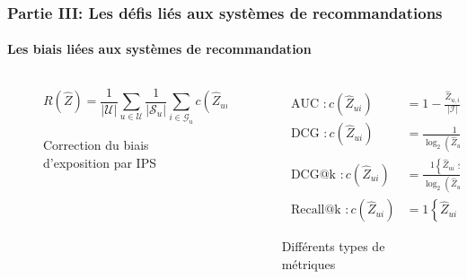 \begin{frame}

    \frametitle{Partie III: Les défis liés aux systèmes de recommandations}
    \framesubtitle{Les biais liées aux systèmes de recommandation}

    \begin{columns}
        \begin{column}{0.5\textwidth}
            \begin{figure}
                \begin{equation*}
                    R(\hat{Z})=\frac{1}{|\mathcal{U}|} \sum_{u \in \mathcal{U}} \frac{1}{\left|\mathcal{S}_u\right|} \sum_{i \in \mathcal{G}_u} c\left(\hat{Z}_{u i}\right)
                \end{equation*}
                \caption{Correction du biais d'exposition par IPS}
            \end{figure}
        \end{column}

        \begin{column}{0.5\textwidth}
            \begin{figure}
                \begin{equation*}
                    \begin{aligned}
                        \text { AUC }: c\left(\hat{Z}_{u i}\right)      & =1-\frac{\hat{Z}_{u, i}}{|\mathcal{I}|}                                           \\
                        \text { DCG }: c\left(\hat{Z}_{u i}\right)      & =\frac{1}{\log _2\left(\hat{Z}_{u i}+1\right)}                                    \\
                        \text { DCG@k }: c\left(\hat{Z}_{u i}\right)    & =\frac{1\left\{\hat{Z}_{u i} \leq k\right\}}{\log _2\left(\hat{Z}_{u i}+1\right)} \\
                        \text { Recall@k }: c\left(\hat{Z}_{u i}\right) & =1\left\{\hat{Z}_{u i} \leq k\right\}
                    \end{aligned}
                \end{equation*}
                \caption{Différents types de métriques}
            \end{figure}
        \end{column}

    \end{columns}

\end{frame}

